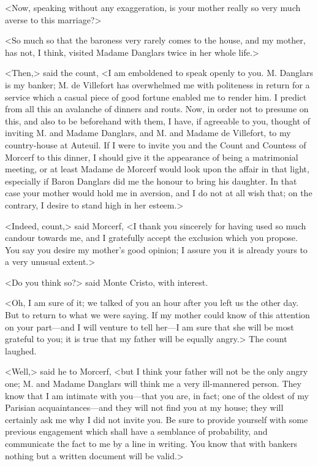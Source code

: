  <Now, speaking without any exaggeration, is your mother really so very much averse to this marriage?> 

 <So much so that the baroness very rarely comes to the house, and my mother, has not, I think, visited Madame Danglars twice in her whole life.> 

 <Then,> said the count, <I am emboldened to speak openly to you. M. Danglars is my banker; M. de Villefort has overwhelmed me with politeness in return for a service which a casual piece of good fortune enabled me to render him. I predict from all this an avalanche of dinners and routs. Now, in order not to presume on this, and also to be beforehand with them, I have, if agreeable to you, thought of inviting M. and Madame Danglars, and M. and Madame de Villefort, to my country-house at Auteuil. If I were to invite you and the Count and Countess of Morcerf to this dinner, I should give it the appearance of being a matrimonial meeting, or at least Madame de Morcerf would look upon the affair in that light, especially if Baron Danglars did me the honour to bring his daughter. In that case your mother would hold me in aversion, and I do not at all wish that; on the contrary, I desire to stand high in her esteem.> 

 <Indeed, count,> said Morcerf, <I thank you sincerely for having used so much candour towards me, and I gratefully accept the exclusion which you propose. You say you desire my mother's good opinion; I assure you it is already yours to a very unusual extent.>

<Do you think so?> said Monte Cristo, with interest. 

 <Oh, I am sure of it; we talked of you an hour after you left us the other day. But to return to what we were saying. If my mother could know of this attention on your part—and I will venture to tell her—I am sure that she will be most grateful to you; it is true that my father will be equally angry.> The count laughed. 

 <Well,> said he to Morcerf, <but I think your father will not be the only angry one; M. and Madame Danglars will think me a very ill-mannered person. They know that I am intimate with you—that you are, in fact; one of the oldest of my Parisian acquaintances—and they will not find you at my house; they will certainly ask me why I did not invite you. Be sure to provide yourself with some previous engagement which shall have a semblance of probability, and communicate the fact to me by a line in writing. You know that with bankers nothing but a written document will be valid.> 

